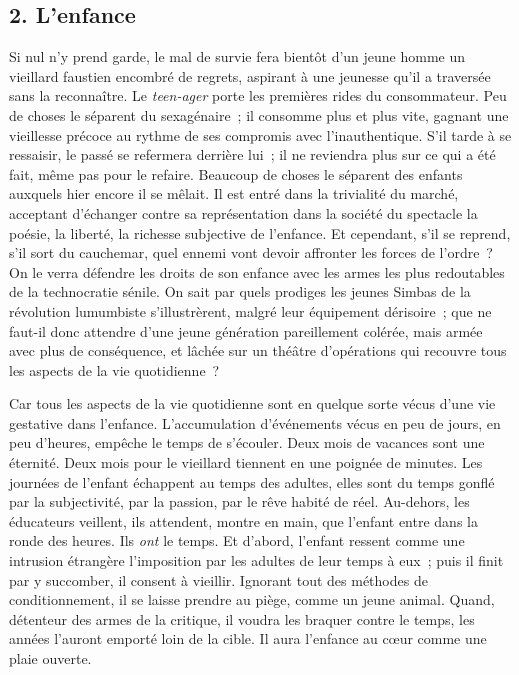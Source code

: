 \documentclass[french,twoside]{book} %
\begin{document}
\subsection[{2. L’enfance}]{\textsc{2.} L’enfance}
\noindent Si nul n’y prend garde, le mal de survie fera bientôt d’un jeune homme un vieillard faustien encombré de regrets, aspirant à une jeunesse qu’il a traversée sans la reconnaître. Le \emph{teen-ager} porte les premières rides du consommateur. Peu de choses le séparent du sexagénaire ; il consomme plus et plus vite, gagnant une vieillesse précoce au rythme de ses compromis avec l’inauthentique. S’il tarde à se ressaisir, le passé se refermera derrière lui ; il ne reviendra plus sur ce qui a été fait, même pas pour le refaire. Beaucoup de choses le séparent des enfants auxquels hier encore il se mêlait. Il est entré dans la trivialité du marché, acceptant d’échanger contre sa représentation dans la société du spectacle la poésie, la liberté, la richesse subjective de l’enfance. Et cependant, s’il se reprend, s’il sort du cauchemar, quel ennemi vont devoir affronter les forces de l’ordre ? On le verra défendre les droits de son enfance avec les armes les plus redoutables de la technocratie sénile. On sait par quels prodiges les jeunes Simbas de la révolution lumumbiste s’illustrèrent, malgré leur équipement dérisoire ; que ne faut-il donc attendre d’une jeune génération pareillement colérée, mais armée avec plus de conséquence, et lâchée sur un théâtre d’opérations qui recouvre tous les aspects de la vie quotidienne ?\par
Car tous les aspects de la vie quotidienne sont en quelque sorte vécus d’une vie gestative dans l’enfance. L’accumulation d’événements vécus en peu de jours, en peu d’heures, empêche le temps de s’écouler. Deux mois de vacances sont une éternité. Deux mois pour le vieillard tiennent en une poignée de minutes. Les journées de l’enfant échappent au temps des adultes, elles sont du temps gonflé par la subjectivité, par la passion, par le rêve habité de réel. Au-dehors, les éducateurs veillent, ils attendent, montre en main, que l’enfant entre dans la ronde des heures. Ils \emph{ont} le temps. Et d’abord, l’enfant ressent comme une intrusion étrangère l’imposition par les adultes de leur temps à eux ; puis il finit par y succomber, il consent à vieillir. Ignorant tout des méthodes de conditionnement, il se laisse prendre au piège, comme un jeune animal. Quand, détenteur des armes de la critique, il voudra les braquer contre le temps, les années l’auront emporté loin de la cible. Il aura l’enfance au cœur comme une plaie ouverte.\par
\end{document}

